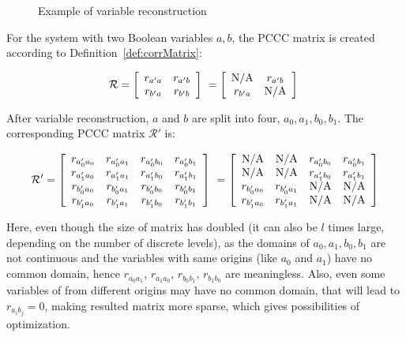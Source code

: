 \begin{figure}[ht]

\caption[Variable reconstruction]{Example of variable reconstruction}\label{varRec}
\end{figure}


For the system with two Boolean variables $a,b$, the PCCC matrix is created according to Definition~\ref{def:corrMatrix}:


$$\mathcal{R}=\left[
\begin{array}{*{20}c}
r_{a'a} & r_{a'b}\\
r_{b'a} & r_{b'b} \\
\end{array}
\right]\ =\left[
\begin{array}{*{20}c}
{\rm N/A} & r_{a'b}\\
r_{b'a} & {\rm N/A} \\
\end{array}
\right]\ 
$$

After variable reconstruction, $a$ and $b$ are split into four, $a_0,a_1,b_0,b_1$.
The corresponding PCCC matrix $\mathcal{R}'$ is:

$$\mathcal{R}'=\left[
\begin{array}{*{20}c}
r_{a'_0a_0} & r_{a'_0a_1}& r_{a'_0b_0}&r_{a'_0b_1}\\
r_{a'_1a_0} & r_{a'_1a_1}& r_{a'_1b_0}&r_{a'_1b_1}\\
r_{b'_0a_0} & r_{b'_0a_1}& r_{b'_0b_0}&r_{b'_0b_1}\\
r_{b'_1a_0} & r_{b'_1a_1}& r_{b'_1b_0}&r_{b'_1b_1}\\
\end{array}
\right]\ =\left[\begin{array}{*{20}c}
{\rm N/A} & {\rm N/A}& r_{a'_0b_0}&r_{a'_0b_1}\\
{\rm N/A} & {\rm N/A}& r_{a'_1b_0}&r_{a'_1b_1}\\
r_{b'_0a_0} & r_{b'_0a_1}& {\rm N/A}&{\rm N/A}\\
r_{b'_1a_0} & r_{b'_1a_1}& {\rm N/A}&{\rm N/A}\\
\end{array}\right]$$

Here, even though the size of matrix has doubled (it can also be $l$ times large, depending on the number of discrete levels), as the domains of $a_0,a_1,b_0,b_1$ are not continuous and the variables with same origins (like $a_0$ and $a_1$) have no common domain, hence $r_{a_0a_1}$, $r_{a_1a_0}$, $r_{b_0b_1}$, $r_{b_1b_0}$ are meaningless. 
Also, even some variables of from different origins may have no common domain, that will lead to $r_{a_ib_j}=0$, making resulted matrix more sparse, which gives possibilities of optimization.

